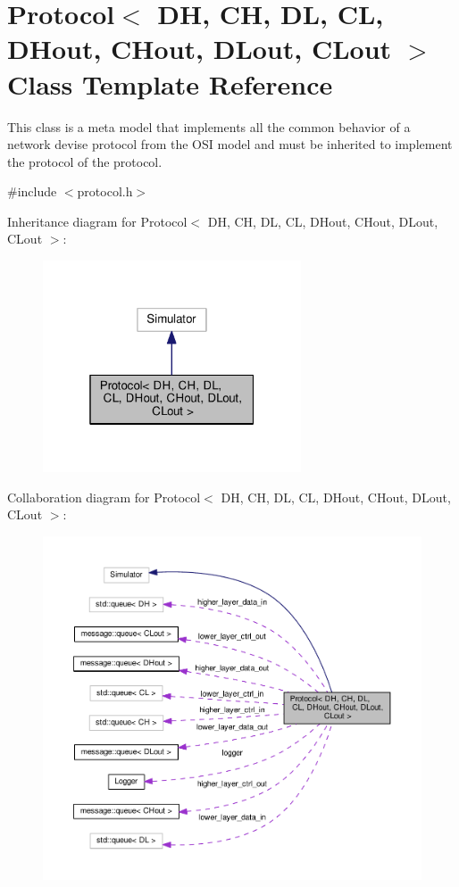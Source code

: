 \hypertarget{classProtocol}{}\section{Protocol$<$ DH, CH, DL, CL, D\+Hout, C\+Hout, D\+Lout, C\+Lout $>$ Class Template Reference}
\label{classProtocol}


This class is a meta model that implements all the common behavior of a network devise protocol from the O\+SI model and must be inherited to implement the protocol of the protocol.  




{\ttfamily \#include $<$protocol.\+h$>$}



Inheritance diagram for Protocol$<$ DH, CH, DL, CL, D\+Hout, C\+Hout, D\+Lout, C\+Lout $>$\+:\nopagebreak
\begin{figure}[H]
\begin{center}
\leavevmode
\includegraphics[width=217pt]{classProtocol__inherit__graph}
\end{center}
\end{figure}


Collaboration diagram for Protocol$<$ DH, CH, DL, CL, D\+Hout, C\+Hout, D\+Lout, C\+Lout $>$\+:\nopagebreak
\begin{figure}[H]
\begin{center}
\leavevmode
\includegraphics[width=350pt]{classProtocol__coll__graph}
\end{center}
\end{figure}
